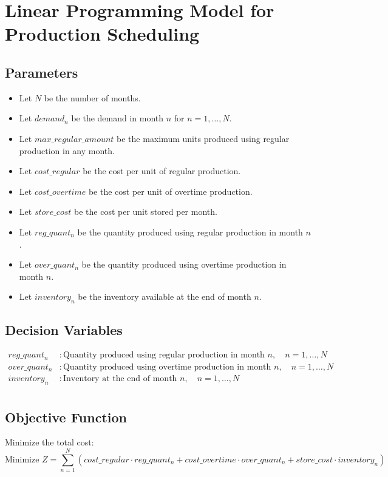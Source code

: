 \documentclass{article}
\begin{document}
\section*{Linear Programming Model for Production Scheduling}

\subsection*{Parameters}
\begin{itemize}
    \item Let \( N \) be the number of months.
    \item Let \( demand_n \) be the demand in month \( n \) for \( n = 1, \ldots, N \).
    \item Let \( max\_regular\_amount \) be the maximum units produced using regular production in any month.
    \item Let \( cost\_regular \) be the cost per unit of regular production.
    \item Let \( cost\_overtime \) be the cost per unit of overtime production.
    \item Let \( store\_cost \) be the cost per unit stored per month.
    
    \item Let \( reg\_quant_n \) be the quantity produced using regular production in month \( n \).
    \item Let \( over\_quant_n \) be the quantity produced using overtime production in month \( n \).
    \item Let \( inventory_n \) be the inventory available at the end of month \( n \).
\end{itemize}

\subsection*{Decision Variables}
\begin{align*}
    reg\_quant_n & : \text{Quantity produced using regular production in month } n, \quad n = 1, \ldots, N \\
    over\_quant_n & : \text{Quantity produced using overtime production in month } n, \quad n = 1, \ldots, N \\
    inventory_n & : \text{Inventory at the end of month } n, \quad n = 1, \ldots, N \\
\end{align*}

\subsection*{Objective Function}
Minimize the total cost:
\[
\text{Minimize } Z = \sum_{n=1}^{N} (cost\_regular \cdot reg\_quant_n + cost\_overtime \cdot over\_quant_n + store\_cost \cdot inventory_n)
\]
\end{document}
